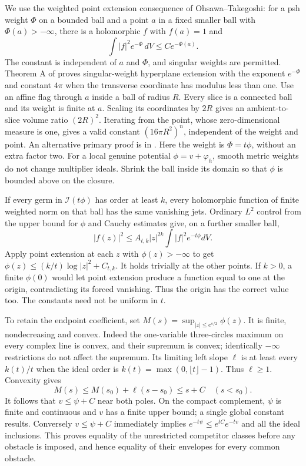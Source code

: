 \documentclass[11pt]{article}
\begin{document}
We use the weighted point extension consequence of Ohsawa--Takegoshi:
for a psh weight $\Phi$ on a bounded ball and a point $a$ in a fixed
smaller ball with $\Phi(a)>-\infty$, there is a holomorphic $f$
with $f(a)=1$ and
\[
 \int |f|^2e^{-\Phi}\,dV\leq C e^{-\Phi(a)}.
\]
The constant is independent of $a$ and $\Phi$, and singular weights
are permitted. Theorem A of \cite{Berndtsson} proves singular-weight hyperplane
extension with the exponent $e^{-\Phi}$ and constant $4\pi$
when the transverse coordinate has modulus less than one.
Use an affine flag through $a$ inside a ball of radius $R$.
Every slice is a connected ball and its weight is finite at $a$.
Scaling its coordinates by $2R$ gives an ambient-to-slice volume
ratio $(2R)^2$. Iterating from the point, whose zero-dimensional
measure is one, gives a valid constant $(16\pi R^2)^n$,
independent of the weight and point. An alternative primary proof
is in \cite[Corollary 12.9, Remark 12.10 and proof of Theorem 12.11]{DemaillyTrieste}.
Here the weight is $\Phi=t\phi$, without an extra factor two.
For a local genuine potential $\phi=v+\varphi_h$, smooth metric
weights do not change multiplier ideals. Shrink the ball inside its
domain so that $\phi$ is bounded above on the closure.

If every germ in $\mathcal I(t\phi)$ has order at least $k$, every
holomorphic function of finite weighted norm on that ball has the same
vanishing jets. Ordinary $L^2$ control from the upper bound for $\phi$
and Cauchy estimates give, on a further smaller ball,
\[
 |f(z)|^2\leq A_{t,k}|z|^{2k}\int |f|^2e^{-t\phi}dV.
\]
Apply point extension at each $z$ with $\phi(z)>-\infty$ to get
$\phi(z)\leq(k/t)\log|z|^2+C_{t,k}$. It holds trivially at
the other points. If $k>0$, a finite $\phi(0)$ would let point
extension produce a function equal to one at the origin, contradicting
its forced vanishing. Thus the origin has the correct value too.
The constants need not be uniform in $t$.

To retain the endpoint coefficient, set
$M(s)=\sup_{|z|\leq e^{s/2}}\phi(z)$. It is finite, nondecreasing
and convex. Indeed the one-variable three-circles maximum on every
complex line is convex, and their supremum is convex; identically
$-\infty$ restrictions do not affect the supremum.
Its limiting left slope $\ell$ is at least every $k(t)/t$ when
the ideal order is $k(t)=\max(0,\lfloor t\rfloor-1)$.
Thus $\ell\geq1$. Convexity gives
\[
 M(s)\leq M(s_0)+\ell(s-s_0)\leq s+C\quad(s<s_0).
\]
It follows that $v\leq\psi+C$ near both poles. On the compact
complement, $\psi$ is finite and continuous and $v$ has a finite
upper bound; a single global constant results. Conversely
$v\leq\psi+C$ immediately implies
$e^{-t\psi}\leq e^{tC}e^{-tv}$ and all the ideal inclusions.
This proves equality of the unrestricted competitor classes before
any obstacle is imposed, and hence equality of their envelopes for
every common obstacle.
\end{document}
